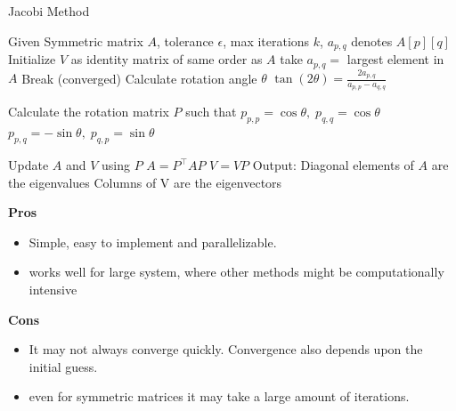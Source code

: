 \documentclass{article}
\begin{document}
\begin{algorithm}[H]
    \caption{Jacobi Method}
    \begin{algorithmic}[1]
        \Statex Given Symmetric matrix $A$, tolerance $\epsilon$, max iterations $k$, $a_{p,q}$ denotes $A[p][q]$
        \State Initialize $V$ as identity matrix of same order as $A$
        \Repeat
            \State take $a_{p,q}=$ largest element in $A$
                         \State Break (converged)
            \EndIf
            \State Calculate rotation angle $\theta$ 
            \Statex \hspace{1cm}  $\tan(2\theta) = \frac{2a_{p,q}}{a_{p,p} - a_{q,q}}$

            \State Calculate the rotation matrix $P$ such that
            \Statex \hspace{1cm}  $p_{p,p} = \cos \theta , \; p_{q,q} = \cos \theta$
            \Statex \hspace{1cm}   $p_{p,q} = -\sin \theta , \; p_{q,p} = \sin \theta$

            \State Update $A$ and $V$ using $P$
            \Statex \hspace{1cm} $A = P^{\top} AP$
            \Statex \hspace{1cm} $V = VP$
    \State Output:
        \Statex \hspace{1cm} Diagonal elements of $A$ are the eigenvalues
        \Statex \hspace{1cm} Columns of V are the eigenvectors
    \end{algorithmic}
\end{algorithm}

\begin{multicols}{2}
\begin{center}\textbf{Pros}\end{center}
\begin{itemize}
    \item Simple, easy to implement and parallelizable.
    \item works well for large system, where other methods might be computationally intensive
\end{itemize}
\columnbreak
\begin{center}\textbf{Cons}\end{center}
\begin{itemize}
    \item It may not always converge quickly. Convergence also depends upon the initial guess.
    \item even for symmetric matrices it may take a large amount of iterations.
\end{itemize}
\end{multicols}
\end{document}
